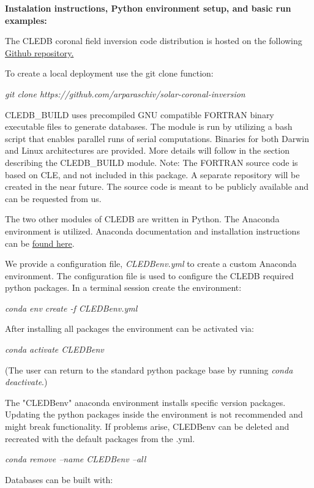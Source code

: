 \documentclass{article}
\begin{document}
\newpage

\textbf{\large Instalation instructions, Python environment setup, and basic run examples:}

The CLEDB coronal field inversion code distribution is hosted on the following \href{https://github.com/arparaschiv/solar-coronal-inversion}{Github repository.} 

To create a local deployment use the git clone function:

\emph{\color{red} git clone https://github.com/arparaschiv/solar-coronal-inversion}

CLEDB\_BUILD uses precompiled GNU compatible FORTRAN binary executable files to generate databases. The module is run by utilizing a bash script that enables parallel runs of serial computations. Binaries for both Darwin and Linux architectures are provided. More details will follow in the section describing the CLEDB\_BUILD module.
Note: The FORTRAN source code is based on CLE, and not included in this package. A separate repository will be created in the near future. The source code is meant to be publicly available and can be requested from us.


The two other modules of CLEDB are written in Python. 
The Anaconda environment is utilized. Anaconda documentation and installation instructions can be \href{https://docs.continuum.io/anaconda/install/}{found here}.

We provide a configuration file, \emph{\color{red}CLEDBenv.yml} to create a custom Anaconda environment. The configuration file is used to configure the CLEDB required python packages. In a terminal session  create the environment:

\emph{\color{red}conda env create -f CLEDBenv.yml}
 
After installing all packages the environment can be activated via:

\emph{\color{red}conda activate CLEDBenv}

(The user can return to the standard python package base by running \emph{\color{red}conda deactivate}.)

The "CLEDBenv" anaconda environment installs specific version packages. Updating the python packages inside the environment is not recommended and might break functionality. If problems arise, CLEDBenv can be deleted and recreated with the default packages from the .yml.

\emph{\color{red}conda remove --name CLEDBenv --all}

Databases can be built with:
\end{document}

